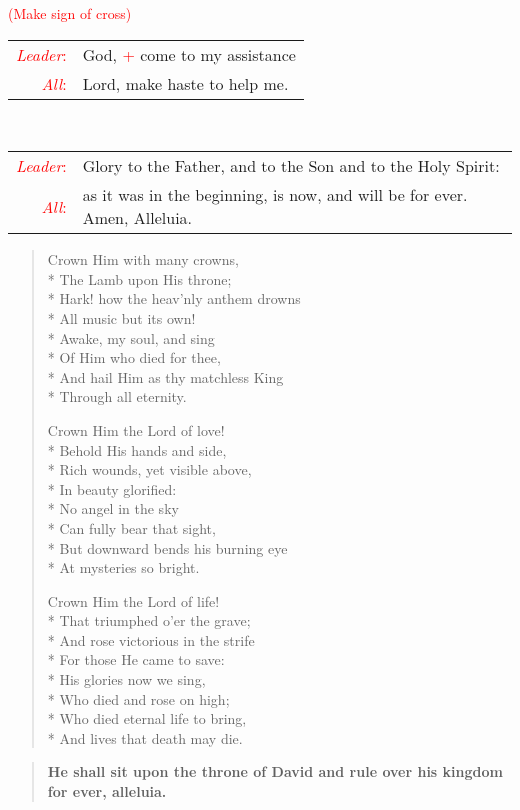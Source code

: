 \documentclass[letterpaper,14pt]{extarticle}
\newcommand{\side}[1]{\flagverse{\textcolor{red}{\textit{#1}}:}}
\newcommand{\sidestar}[1]{\textcolor{red}{\textit{#1}:}}
\newcommand{\rednote}[1]{\textcolor{red}{#1}}
\newlength{\oldindent}
\newcommand{\antiphon}[2]{
	\setlength{\oldindent}{\vindent}
	\setlength{\vindent}{0em}
	\begin{verse}
	\side{#1} \textbf{#2}
	\end{verse}
	\setlength{\vindent}{\oldindent}
}
\newcommand{\intercession}[2]{
	\begin{tabular}[h]{r p{4.25in}}
		\sidestar{Leader} & #1 \\
		\sidestar{All} & #2
	\end{tabular}}
\begin{document}
\hspace{\leftmargini}\rednote{(Make sign of cross)}\\
\intercession{God, \rednote{+} come to my assistance}
{Lord, make haste to help me.}\\
\intercession{Glory to the Father, and to the Son and to the Holy Spirit:}
{as it was in the beginning, is now, and will be for ever. Amen, Alleluia.}

\begin{verse}

Crown Him with many crowns, \\*
The Lamb upon His throne; \\*
Hark! how the heav'nly anthem drowns \\*
All music but its own!\\*
Awake, my soul, and sing\\*
Of Him who died for thee,\\*
And hail Him as thy matchless King\\*
Through all eternity.

Crown Him the Lord of love! \\*
Behold His hands and side, \\*
Rich wounds, yet visible above, \\*
In beauty glorified: \\*
No angel in the sky\\*
Can fully bear that sight,\\*
But downward bends his burning eye \\*
At mysteries so bright.

Crown Him the Lord of life! \\*
That triumphed o'er the grave; \\*
And rose victorious in the strife\\*
For those He came to save:\\*
His glories now we sing,\\*
Who died and rose on high;\\*
Who died eternal life to bring,\\*
And lives that death may die.

\end{verse}
{}
\antiphon{Leader 1}{He shall sit upon the throne of David and rule over his kingdom for ever, alleluia.}
\end{document}

